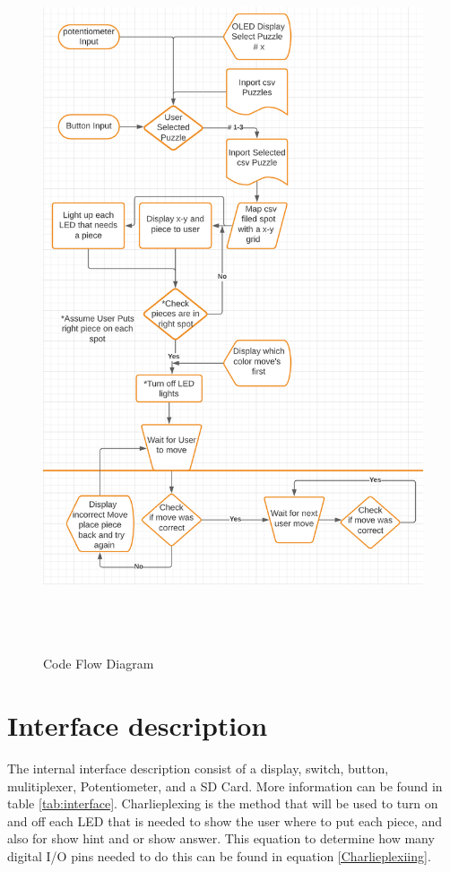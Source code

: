 \documentclass[11pt]{article}
\begin{document}
\begin{center}
\begin{figure}
  \includegraphics[width=17cm,height=21cm]{./Pics/Code_Flow_Diagram.PNG}
  \caption{Code Flow Diagram}
  \label{fig:CFD1}
\end{figure}
\end{center}

\section{Interface description}
The internal interface description consist of a display, switch, button, mulitiplexer, Potentiometer, and a SD Card. More information can be found in table \ref{tab:interface}. Charlieplexing is the method that will be used to turn on and off each LED that is needed to show the user where to put each piece, and also for show hint and or show answer. This equation to determine how many digital I/O pins needed to do this can be found in equation \eqref{Charlieplexiing}.
\end{document}
